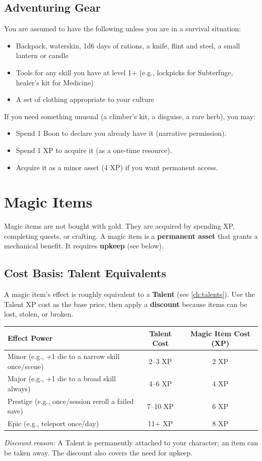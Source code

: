 \subsection{Adventuring Gear}
You are assumed to have the following unless you are in a survival situation:
\begin{itemize}
  \item Backpack, waterskin, 1d6 days of rations, a knife, flint and steel, a small lantern or candle
  \item Tools for any skill you have at level 1+ (e.g., lockpicks for Subterfuge, healer's kit for Medicine)
  \item A set of clothing appropriate to your culture
\end{itemize}
If you need something unusual (a climber's kit, a disguise, a rare herb), you may:
\begin{itemize}
  \item Spend 1 Boon to declare you already have it (narrative permission).
  \item Spend 1 XP to acquire it (as a one-time resource).
  \item Acquire it as a minor asset (4 XP) if you want permanent access.
\end{itemize}

\section{Magic Items}
Magic items are not bought with gold. They are acquired by spending XP, completing quests, or crafting. A magic item is a \textbf{permanent asset} that grants a mechanical benefit. It requires \textbf{upkeep} (see below).

\subsection{Cost Basis: Talent Equivalents}
A magic item's effect is roughly equivalent to a \textbf{Talent} (see \ref{ch:talents}). Use the Talent XP cost as the base price, then apply a \textbf{discount} because items can be lost, stolen, or broken.

\begin{center}
\begin{tabular}{lcc}
\toprule
\textbf{Effect Power} & \textbf{Talent Cost} & \textbf{Magic Item Cost (XP)} \\
\midrule
Minor (e.g., +1 die to a narrow skill once/scene) & 2--3 XP & 2 XP \\
Major (e.g., +1 die to a broad skill always) & 4--6 XP & 4 XP \\
Prestige (e.g., once/session reroll a failed save) & 7--10 XP & 6 XP \\
Epic (e.g., teleport once/day) & 11+ XP & 8 XP \\
\bottomrule
\end{tabular}
\end{center}
\emph{Discount reason:} A Talent is permanently attached to your character; an item can be taken away. The discount also covers the need for upkeep.

